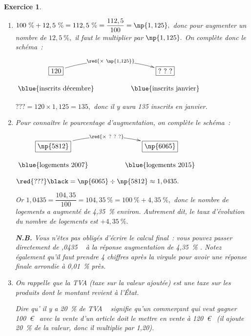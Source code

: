 \documentclass[10pt]{article}
\newtheorem{exo}{Exercice}
\begin{document}
\begin{exo}

\begin{enumerate}
\item $100~\%+12,5~\%=112,5~\%=\dfrac{112,5}{100}=\np{1,125},$ donc pour augmenter un nombre de $12,5~\%,$ il faut le multiplier par $\np{1,125}.$ On complète donc le schéma~:

\begin{center}
$\xymatrix@R=0.5pc@C=4pc{
    *+[F]+\txt{120} \ar@/^0.5cm/[r]|{\red{\times ~\np{1,125}}} & 
    *+[F]+\txt{?~?~?}  \\
    \txt{\blue{inscrits décembre}}&
    \txt{\blue{inscrits janvier}}}$
    
    \end{center}
    
    \medskip
    
 $???=120\times 1,125=135,$ donc il y aura 135 inscrits en janvier. 


\item Pour connaître le pourcentage d'augmentation, on complète le schéma~:

\begin{center}
$\xymatrix@R=0.5pc@C=4pc{
    *+[F]+\txt{\np{5812}} \ar@/^0.5cm/[r]|{\red{\times ~?~?~?}} & 
    *+[F]+\txt{\np{6065}}  \\
    \txt{\blue{logements 2007}}&
    \txt{\blue{logements 2015}}}$
    
    \end{center}
    
    \medskip
$\red{???}\black =\np{6065}\div\np{5812}\approx 1,0435.$

Or $1,0435=\dfrac{104,35}{100}=104,35~\%=100~\%+4,35~\%,$ donc le nombre de logements a augmenté de 4,35~\% environ. Autrement dit, le taux d'évolution du nombre de logements est $+4,35~\%.$

\medskip

\textbf{N.B.} Vous n'êtes pas obligés d'écrire le calcul final~: vous pouvez passer directement de ,0435 \fg~{} à la réponse \og augmentation de 4,35~\% \fg. Notez également qu'il faut prendre 4 chiffres après la virgule pour avoir une réponse finale arrondie à 0,01~\% près.
\item On rappelle que la TVA (taxe sur la valeur ajoutée) est une taxe sur les produits dont le montant revient à l’État.

Dire qu' \og il y a 20~\% de TVA \fg~{} signifie qu'un commerçant qui veut gagner 100~\euro~{} avec la vente d'un article doit le mettre en vente à 120~\euro~{} (il ajoute 20~\% de la valeur, donc il multiplie par 1,20).


\end{enumerate}
\end{exo}
\end{document}
